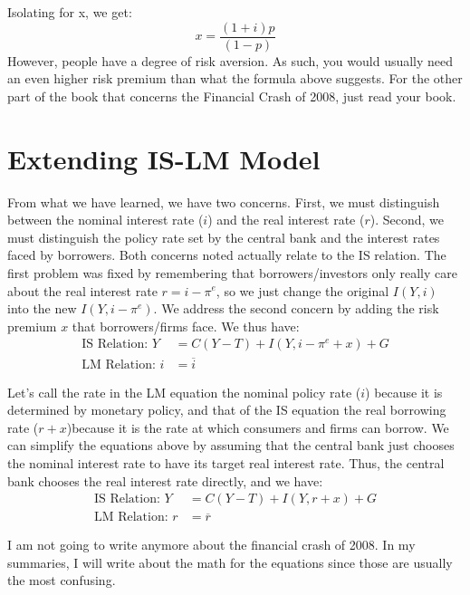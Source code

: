 \documentclass{extarticle}
\begin{document}
Isolating for x, we get:
$$x = \frac{(1+i)p}{(1-p)}$$
However, people have a degree of risk aversion. As such, you would usually need an even higher risk premium than what the formula above suggests. For the other part of the book that concerns the Financial Crash of 2008, just read your book. 

\section{Extending IS-LM Model}
From what we have learned, we have two concerns. First, we must distinguish between the nominal interest rate ($i$) and the real interest rate ($r$). Second, we must distinguish the policy rate set by the central bank and the interest rates faced by borrowers.
Both concerns noted actually relate to the IS relation. The first problem was fixed by remembering that borrowers/investors only really care about the real interest rate $r = i - \pi^e$, so we just change the original $I(Y, i)$ into the new $I(Y, i - \pi^e)$. We address the second concern by adding the risk premium $x$ that borrowers/firms face. We thus have:
\begin{align*}
  \text{IS Relation: } Y &= C(Y-T) + I(Y, i - \pi^e + x) + G \\
  \text{LM Relation: } i &= \overline{i}
\end{align*}

Let’s call the rate in the LM equation the nominal policy rate ($i$) because it is determined by monetary policy, and that of the IS equation the real borrowing rate ($r+x$)because it is the rate at which consumers and firms can borrow. We can simplify the equations above by assuming that the central bank just chooses the nominal interest rate to have its target real interest rate. Thus, the central bank chooses the real interest rate directly, and we have:
\begin{align*}
  \text{IS Relation: } Y &= C(Y-T) + I(Y, r + x) + G \\
  \text{LM Relation: } r &= \overline{r}
\end{align*}

I am not going to write anymore about the financial crash of 2008. In my summaries, I will write about the math for the equations since those are usually the most confusing.
\end{document}
